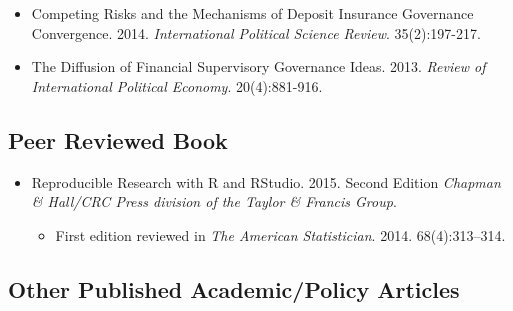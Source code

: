 \documentclass[a4paper]{article}
\begin{document}
\begin{itemize}
    \item Competing Risks and the Mechanisms of Deposit Insurance Governance Convergence. 2014. {\emph{International Political Science Review}}. 35(2):197-217.

    \item The Diffusion of Financial Supervisory Governance Ideas. 2013. {\emph{Review of International Political Economy}}. 20(4):881-916.

\end{itemize}

\subsection*{Peer Reviewed Book}

\begin{itemize}
    \item Reproducible Research with R and RStudio. 2015. Second Edition {\emph{Chapman \& Hall/CRC Press division of the Taylor \& Francis Group}}.

        \begin{itemize}
            \item First edition reviewed in \emph{The American Statistician}. 2014. 68(4):313--314.
        \end{itemize}

\end{itemize}

\subsection*{Other Published Academic/Policy Articles}
\end{document}
